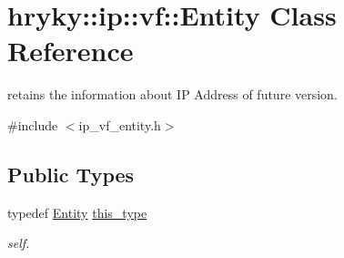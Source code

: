 \hypertarget{classhryky_1_1ip_1_1vf_1_1_entity}{\section{hryky\-:\-:ip\-:\-:vf\-:\-:Entity Class Reference}
\label{classhryky_1_1ip_1_1vf_1_1_entity}
}


retains the information about I\-P Address of future version.  




{\ttfamily \#include $<$ip\-\_\-vf\-\_\-entity.\-h$>$}

\subsection*{Public Types}
\begin{DoxyCompactItemize}
\item 
\hypertarget{classhryky_1_1ip_1_1vf_1_1_entity_adf2e2de606d79343c1f1a1aa016d9abd}{typedef \hyperlink{classhryky_1_1ip_1_1vf_1_1_entity}{Entity} \hyperlink{classhryky_1_1ip_1_1vf_1_1_entity_adf2e2de606d79343c1f1a1aa016d9abd}{this\-\_\-type}}\label{classhryky_1_1ip_1_1vf_1_1_entity_adf2e2de606d79343c1f1a1aa016d9abd}

\begin{DoxyCompactList}\small\item\em self. \end{DoxyCompactList}\end{DoxyCompactItemize}
